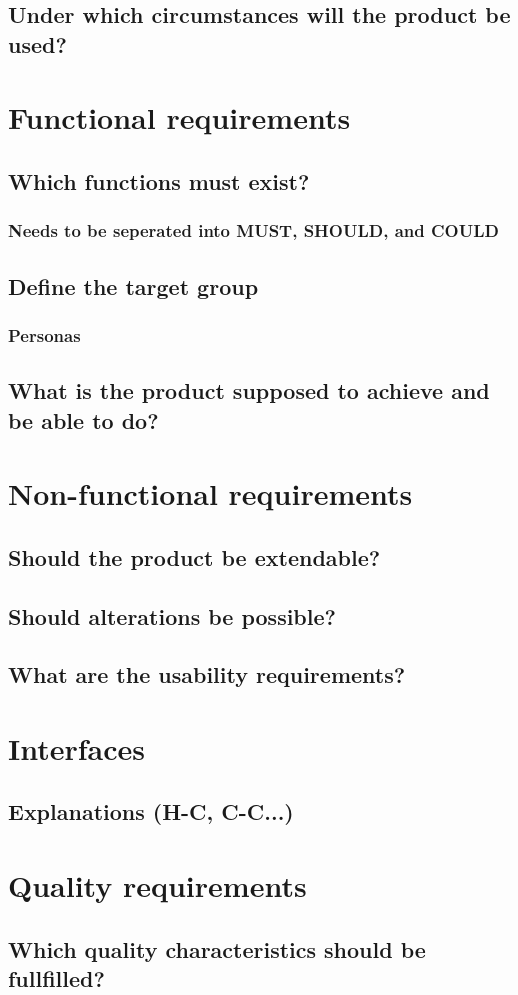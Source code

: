 \documentclass{article}
\begin{document}
\subsection{Under which circumstances will the product be used?}


\section{Functional requirements}

\subsection{Which functions must exist?}
\subsubsection{Needs to be seperated into MUST, SHOULD, and COULD}
 
\subsection{Define the target group}
\subsubsection{Personas}

\subsection{What is the product supposed to achieve and be able to do?}

 
\section{Non-functional requirements}

\subsection{Should the product be extendable?}

\subsection{Should alterations be possible?}

\subsection{What are the usability requirements?}


\section{Interfaces}

\subsection{Explanations (H-C, C-C...)}

 
\section{Quality requirements}

\subsection{Which quality characteristics should be fullfilled?}
\end{document}
